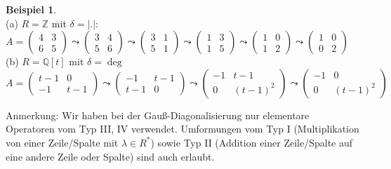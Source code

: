 \documentclass[10pt,a4paper,numbers=endperiod]{scrartcl}
\theoremstyle{definition}
\newtheorem{bsp}[satz]{Beispiel}
\def\QQ{{\mathbb Q}}
\def\ZZ{{\mathbb Z}}
\begin{document}
\begin{bsp} $ $\\
	(a) $R = \ZZ$ mit $\delta = |.|$:\\
	$A = \begin{pmatrix}
	4 & 3\\
	6 & 5
	\end{pmatrix} \leadsto \begin{pmatrix}
	3 & 4\\
	5 & 6
	\end{pmatrix} \leadsto \begin{pmatrix}
	3 & 1\\
	5 & 1
	\end{pmatrix} \leadsto \begin{pmatrix}
	1 & 3\\
	1 & 5
	\end{pmatrix} \leadsto \begin{pmatrix}
	1 & 0\\
	1 & 2
	\end{pmatrix} \leadsto \begin{pmatrix}
	1 & 0\\
	0 & 2
	\end{pmatrix}$\\
	
	(b) $R = \QQ[t]$ mit $\delta = \deg$\\
	$A = \begin{pmatrix}
	t-1 & 0\\
	-1 & t-1
	\end{pmatrix} \leadsto \begin{pmatrix}
	-1 & t-1\\
	t-1 & 0
	\end{pmatrix} \leadsto \begin{pmatrix}
	-1 & t-1\\
	0 & (t-1)^2
	\end{pmatrix} \leadsto \begin{pmatrix}
	-1 & 0\\
	0 & (t-1)^2
	\end{pmatrix}$
	
\end{bsp}

Anmerkung: Wir haben bei der Gauß-Diagonalisierung nur elementare Operatoren vom Typ III, IV verwendet. Umformungen vom Typ I (Multiplikation von einer Zeile/Spalte mit $\lambda \in R^*$) sowie Typ II (Addition einer Zeile/Spalte auf eine andere Zeile oder Spalte) sind auch erlaubt.\\
\end{document}
